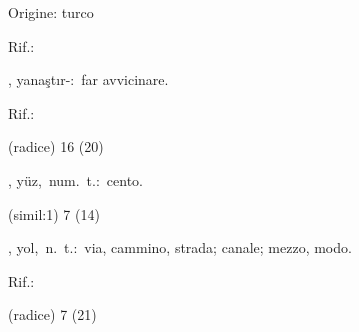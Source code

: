 \begin{glossario}{Origine: turco}
\begin{subvocedue}
\item[Rif.:] 
\end{subvocedue}
\begin{subvocedue}
\item[\subglossariobullet] , {\sf yanaştır-}:\ far avvicinare.
\begin{subvocedue}
\item[Rif.:] 
\end{subvocedue}
\item[(radice)]   16 (20)
\end{subvocedue}
\item[{\color{colorlowref}\spzrl{y:Uz}},] {\sf yüz},\ num.\ t.:\ cento.
\begin{subvocedue}
\item[(simil:1)]   7 (14)
\end{subvocedue}
\item[{\color{colorlowref}\spzrl{y.Ol}},] {\sf yol},\ n.\ t.:\ via, cammino, strada; canale; mezzo, modo.
\begin{subvocedue}
\item[Rif.:] 
\end{subvocedue}
\begin{subvocedue}
\item[(radice)]   7 (21)
\end{subvocedue}
\end{glossario}
